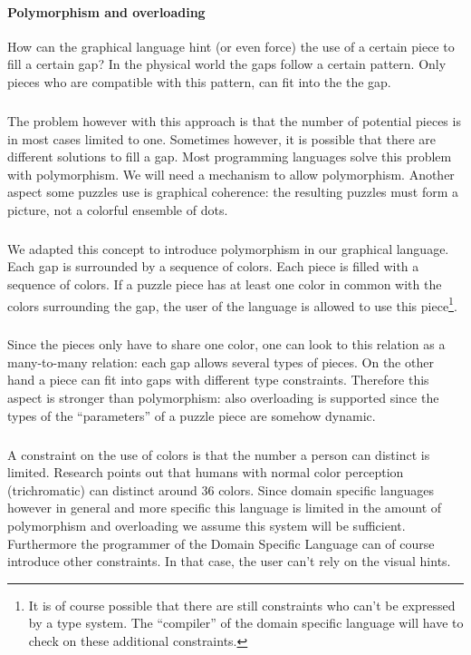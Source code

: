 \paragraph{Polymorphism and overloading}
How can the graphical language hint (or even force) the use of a certain piece
to fill a certain gap? In the physical world the gaps follow a certain pattern.
Only pieces who are compatible with this pattern, can fit into the the gap.
\subparagraph{}
The problem however with this approach is that the number of potential pieces
is in most cases limited to one. Sometimes however, it is possible that there
are different solutions to fill a gap. Most programming languages solve this
problem with polymorphism. We will need a mechanism to allow polymorphism.
Another aspect some puzzles use is graphical coherence: the resulting puzzles
must form a picture, not a colorful ensemble of dots.
\subparagraph{}
We adapted this concept to introduce polymorphism in our graphical language.
Each gap is surrounded by a sequence of colors. Each piece is filled with a
sequence of colors. If a puzzle piece has at least one color in common with the
colors surrounding the gap, the user of the language is allowed to use this
piece\footnote{It is of course possible that there are still constraints who
can't be expressed by a type system. The ``compiler'' of the domain specific
language will have to check on these additional constraints.}.
\subparagraph{}
Since the pieces only have to share one color, one can look to this relation as
a many-to-many relation: each gap allows several types of pieces. On the
other hand a piece can fit into gaps with different type constraints. Therefore
this aspect is stronger than polymorphism: also overloading is supported since
the types of the ``parameters'' of a puzzle piece are somehow dynamic.
\subparagraph{}
A constraint on the use of colors is that the number a person can distinct is
limited. Research points out that humans with normal color perception
(trichromatic) can distinct around 36 colors. Since domain specific languages
however in general and more specific this language is limited in the amount of
polymorphism and overloading we assume this system will be sufficient.
Furthermore the programmer of the Domain Specific Language can of course
introduce other constraints. In that case, the user can't rely on the visual
hints.
